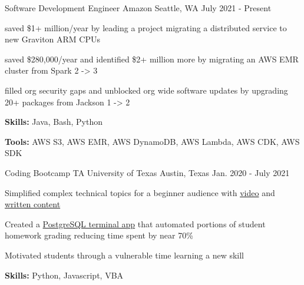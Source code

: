 

\begin{cventries}

  \cventry
    {Software Development Engineer} %
    {Amazon} %
    {Seattle, WA} %
    {July 2021 - Present} %
    {
      \begin{cvitems} %
        \item {saved \$1+ million/year by leading a project migrating a distributed service to new Graviton ARM CPUs}
        \item {saved \$280,000/year and identified \$2+ million more by migrating an AWS EMR cluster from Spark 2 -> 3}
        \item {filled org security gaps and unblocked org wide software updates by upgrading 20+ packages from Jackson 1 -> 2}
        \item {\textbf{Skills:} Java, Bash, Python}
        \item {\textbf{Tools:} AWS S3, AWS EMR, AWS DynamoDB, AWS Lambda, AWS CDK, AWS SDK}
      \end{cvitems}
    }

  \cventry
    {Coding Bootcamp TA} %
    {University of Texas} %
    {Austin, Texas} %
    {Jan. 2020 - July 2021} %
    {
      \begin{cvitems} %
        \item {Simplified complex technical topics for a beginner audience with \href{https://youtu.be/G4tDjGUD-T4}{video} and \href{https://www.linkedin.com/pulse/how-deal-knowledge-work-frustration-geoff-langenderfer/?trackingId=Z6YGiHpVRFi4PCNxybaPfw\%3D\%3D}{written content}}
        \item {Created a \href{https://youtu.be/ELCZ5dAS6Zg}{PostgreSQL terminal app} that automated portions of student homework grading reducing time spent by near 70\%}
        \item {Motivated students through a vulnerable time learning a new skill}
        \item {\textbf{Skills:} Python, Javascript, VBA}
      \end{cvitems}
    }

\end{cventries}
